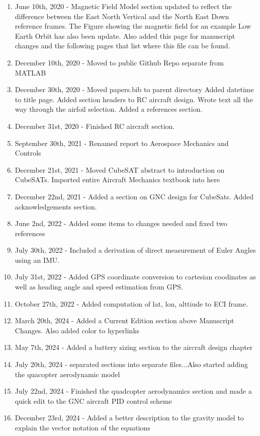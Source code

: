 \documentclass{article}
\begin{document}
\begin{enumerate}[itemsep=-5pt]
\item June 10th, 2020 - Magnetic Field Model section updated to
  reflect the difference between the East North Vertical and the North
  East Down reference frames. The Figure showing the magnetic field
  for an example Low Earth Orbit has also been update. Also added this
  page for manuscript changes and the following pages that list where
  this file can be found.
\item December 10th, 2020 - Moved to public Github Repo separate from
  MATLAB
\item December 30th, 2020 - Moved papers.bib to parent directory Added
  datetime to title page. Added  section headers to RC aircraft
  design. Wrote text all the way through the airfoil selection. Added
  a references section.
\item December 31st, 2020 - Finished RC aircraft section.
\item September 30th, 2021 - Renamed report to Aerospace Mechanics and
  Controls
\item December 21st, 2021 - Moved CubeSAT abstract to introduction on
  CubeSATs. Imported entire Aircraft Mechanics textbook into here
\item December 22nd, 2021 - Added a section on GNC design for
  CubeSats. Added acknowledgements section.
\item June 2nd, 2022 - Added some items to changes needed and fixed
  two references
\item July 30th, 2022 - Included a derivation of direct measurement of Euler Angles using an IMU.
\item July 31st, 2022 - Added GPS coordinate conversion to cartesian coodinates as well as heading angle and speed estimation from GPS.
\item October 27th, 2022 - Added computation of lat, lon, alttiude to ECI frame.
\item March 20th, 2024 - Added a Current Edition section above
  Manuscript Changes. Also added color to hyperlinks
\item May 7th, 2024 - Added a battery sizing section to the aircraft
  design chapter
\item July 20th, 2024 - separated sections into separate files...Also started adding the quacopter aerodynamic model
\item July 22nd, 2024 - Finished the quadcopter aerodynamics section and made a quick edit to the GNC aircraft PID control scheme
\item December 23rd, 2024 - Added a better description to the gravity model to explain the vector notation of the equations

\end{enumerate}
\end{document}
